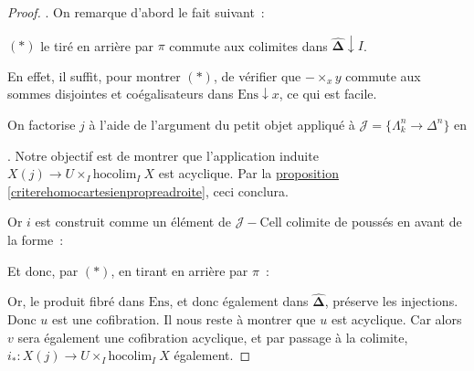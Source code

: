 \documentclass{amsart}
\newcommand{\sref}[2]{\hyperref[#2]{#1 \ref*{#2}}}
\theoremstyle{plain}
\theoremstyle{definition}
\theoremstyle{remark}
\newcommand{\Ens}{\mathrm{Ens}}
\newcommand{\DEns}{\widehat{\mathbf{\Delta}}}
\newcommand{\hocolim}[2]{\mathrm{hocolim}_{#1}\:{#2}}
\newcommand{\ra}{\rightarrow}
\begin{document}
\begin{proof}
  \cite[IV.5.7]{Goer}. On remarque d'abord le fait suivant~:

  $(*)$ le tiré en arrière par $\pi$ commute aux colimites dans $\DEns\downarrow I$.
  
  En effet, il suffit, pour montrer $(*)$, de vérifier que $-\times_x y$ commute aux sommes disjointes et coégalisateurs dans $\Ens\downarrow x$,
  ce qui est facile.

  On factorise $j$ à l'aide de l'argument du petit objet appliqué à $\mathcal{J}=\{\Lambda_k^n\ra\Delta^n\}$ en
  .
  Notre objectif est de montrer que l'application induite $X(j)\ra U\times_I\hocolim{I}{X}$ est acyclique.
  Par la \sref{proposition}{criterehomocartesienpropreadroite}, ceci conclura.

  Or $i$ est construit comme un élément de $\mathcal{J}-\mathrm{Cell}$ colimite de poussés en avant de la forme~:
  \begin{center}
  \end{center}
  Et donc, par $(*)$, en tirant en arrière par $\pi$~:
  \begin{center}
  \end{center}
  Or, le produit fibré dans $\Ens$, et donc également dans $\DEns$, préserve les injections. Donc $u$ est une cofibration.
  Il nous reste à montrer que $u$ est acyclique. Car alors $v$ sera également une cofibration acyclique, et par passage à la colimite,
  $i_*:X(j)\ra U\times_I\hocolim{I}{X}$ également.


\end{proof}
\end{document}
